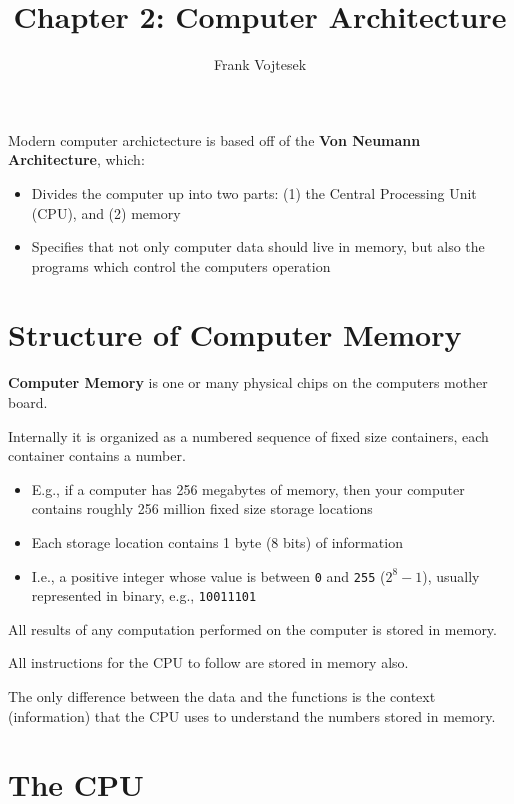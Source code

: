 \documentclass{article}
\title {Chapter 2: Computer Architecture}
\author {Frank Vojtesek}
\newcommand {\code}{\texttt}
\begin{document}
	\maketitle
	
	Modern computer archictecture is based off of the \textbf {Von Neumann Architecture},
	which:
	\begin {itemize}
		\item Divides the computer up into two parts: (1) the Central Processing Unit (CPU),
			and (2) memory
		\item Specifies that not only computer data should live in memory, but also the
			programs which control the computers operation 
	\end {itemize}

	\section {Structure of Computer Memory}
	\label {sec:structure_of_memory}	
	
	\textbf {Computer Memory} is one or many physical chips on the computers mother board.
	
	Internally it is organized as a numbered sequence of fixed size containers, each
	container contains a number.
	\begin {itemize}
		\item E.g., if a computer has 256 megabytes of memory, then your computer
			contains roughly 256 million fixed size storage locations
		\item Each storage location contains 1 byte (8 bits) of information
		\item I.e., a positive integer whose value is between \code 0 and \code {255}
			($ 2^8 - 1$), usually
			represented in binary, e.g., \code {10011101}
	\end {itemize}
	
	All results of any computation performed on the computer is stored in memory.
	
	All instructions for the CPU to follow are stored in memory also.
	
	The only difference between the data and the functions is the context (information)
	that the CPU uses to understand the numbers stored in memory.

	\section {The CPU}
	\label {sec:the_cpu}	
	
\end{document}
